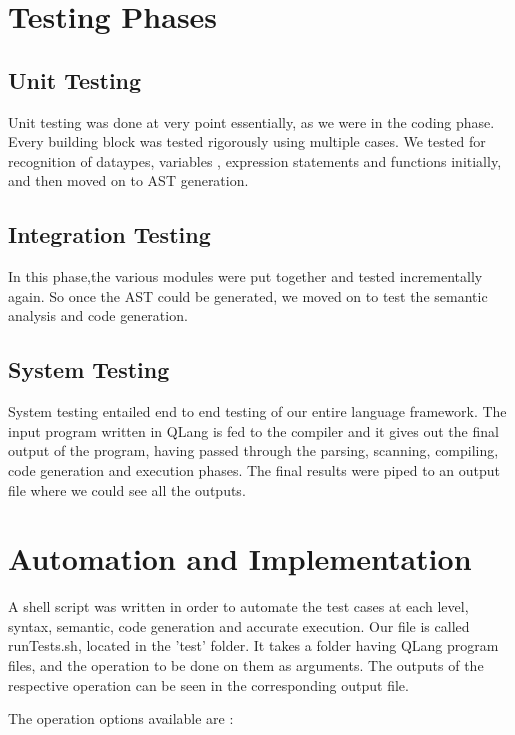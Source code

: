 \section{Testing Phases}

\subsection{Unit Testing}
Unit testing was done at very point essentially, as we were in the coding phase. Every building block was tested rigorously using multiple cases. We tested for recognition of dataypes, variables , expression statements and functions initially, and then moved on to AST generation.

\subsection{Integration Testing}
In this phase,the various modules were put together and tested incrementally again. So once the AST could be generated, we moved on to test the semantic analysis and code generation.

\subsection{System Testing}
System testing entailed end to end testing of our entire language framework. The input program written in QLang is fed to the compiler and it gives out the final output of the program, having passed through the parsing, scanning, compiling, code generation and execution phases. The final results were piped to an output file where we could see all the outputs.


\section{Automation and Implementation}
A shell script was written in order to automate the test cases at each level, syntax, semantic, code
generation and accurate execution. 
Our file is called runTests.sh, located in the 'test' folder. It takes a folder having QLang program files, and the operation to be done on them as arguments. The outputs of the respective operation can be seen in the corresponding output file. 


The operation options available are :


